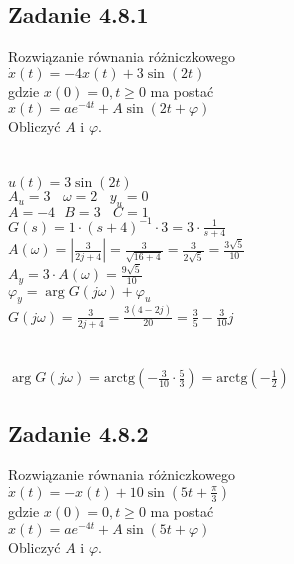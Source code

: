 \pagebreak
\subsection*{Zadanie 4.8.1} {\color{darkgray}
	Rozwiązanie równania różniczkowego\\
	$\dot{x}(t)=-4x(t)+3\sin(2t)$\\
	gdzie $x(0)=0, t \geqslant 0$ ma postać\\
	$x(t)=ae^{-4t}+A\sin(2t+\varphi)$\\
	Obliczyć $A$ i $\varphi$.\\
}\lineh
\\\\
$u(t)=3\sin(2t)$\\
$A_u=3 \ \ \ \ \omega = 2 \ \ \ \ y_u=0$\\
$A=-4 \ \ \ B=3 \ \ \ \ C=1$\\
$G(s)=1\cdot(s+4)^{-1} \cdot 3=3 \cdot \frac{1}{s+4}$\\
$A(\omega)=|\frac{3}{2j+4}|=\frac{3}{\sqrt{16+4}}=\frac{3}{2\sqrt{5}}=\frac{3\sqrt{5}}{10}$\\
$A_y=3\cdot A(\omega)=\frac{9\sqrt{5}}{10}$\\
$\varphi_y=\arg G(j\omega)+\varphi_u$\\
$G(j\omega)=\frac{3}{2j+4}=\frac{3(4-2j)}{20}=\frac 3 5 -\frac{3}{10}j$\\
\\\\
$\arg G(j\omega)=\text{arctg}(-\frac{3}{10} \cdot \frac{5}{3})=\boxed{\text{arctg}(-\frac{1}{2})}$\\

\pagebreak
\subsection*{Zadanie 4.8.2} {\color{darkgray}
	Rozwiązanie równania różniczkowego\\
	$\dot{x}(t)=-x(t)+10\sin(5t+\frac\pi 3)$\\
	gdzie $x(0)=0, t \geqslant 0$ ma postać\\
	$x(t)=ae^{-4t}+A\sin(5t+\varphi)$\\
	Obliczyć $A$ i $\varphi$.\\
}\lineh
\\\\

